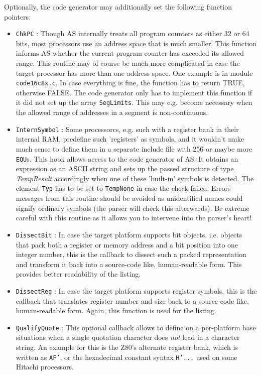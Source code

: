 \documentclass[12pt,twoside]{report}
\newcommand{\tty}[1]{{\tt #1}}
\begin{document}
Optionally, the code generator may additionally set the following function
pointers:
\begin{itemize}
\item{\tty{ChkPC} : Though AS internally treats all program counters as
      either 32 or 64 bits, most processors use an address space that is
      much smaller.  This function informs AS whether the current program
      counter has exceeded its allowed range.  This routine may of course
      be much more complicated in case the target processor has more than
      one address space.  One example is in module \tty{code16c8x.c}.  In
      case everything is fine, the function has to return TRUE, otherwise
      FALSE.  The code generator only has to implement this function if
      it did not set up the array {\tt SegLimits}.  This may e.g. become
      necessary when the allowed range of addresses in a segment is
      non-continuous.}
\item{\tty{InternSymbol} : Some processorcs, e.g. such with a register
      bank in their internal RAM, predefine such 'registers' as symbols,
      and it wouldn't make much sense to define them in a separate include
      file with 256 or maybe more {\tt EQU}s.  This hook allows access to
      the code generator of AS: It obtains an expression as an ASCII
      string and sets up the passed structure of type {\em TempResult}
      accordingly when one of these 'built-in' symbols is detected.  The
      element {\tt Typ} has to be set to {\tt TempNone} in case the check
      failed.  Errors messages from this routine should be avoided as
      unidentified names could signify ordinary symbols (the parser will
      check this afterwards).  Be extreme careful with this routine as
      it allows you to intervene into the parser's heart!}
\item{\tty{DissectBit} : In case the target platform supports bit objects,
      i.e. objects that pack both a register or memory address and a bit
      position into one integer number, this is the callback to dissect
      such a packed representation and transform it back into a source-code
      like, human-readable form.  This provides better readability of the
      listing.}
\item{\tty{DissectReg} : In case the target platform supports register
      symbols, this is the callback that translates register number and size
      back to a source-code like, human-readable form.  Again, this function
      is used for the listing.}
\item{\tty{QualifyQuote} : This optional callback allows to define on a
      per-platform base situations when a single quotation character does
      {\em not} lead in a character string.  An example for this is the
      Z80's alternate register bank, which is written as \tty{AF'}, or
      the hexadecimal constant syntax \tty{H'...} used on some Hitachi
      processors.}
\end{itemize}
\end{document}
